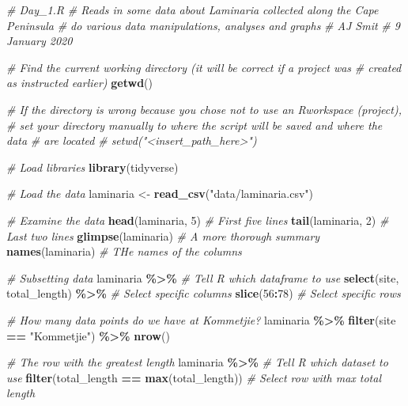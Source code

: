 \documentclass[
]{book}
\newenvironment{Shaded}{\begin{snugshade}}{\end{snugshade}}
\newcommand{\CommentTok}[1]{\textcolor[rgb]{0.56,0.35,0.01}{\textit{#1}}}
\newcommand{\DecValTok}[1]{\textcolor[rgb]{0.00,0.00,0.81}{#1}}
\newcommand{\KeywordTok}[1]{\textcolor[rgb]{0.13,0.29,0.53}{\textbf{#1}}}
\newcommand{\NormalTok}[1]{#1}
\newcommand{\OperatorTok}[1]{\textcolor[rgb]{0.81,0.36,0.00}{\textbf{#1}}}
\newcommand{\StringTok}[1]{\textcolor[rgb]{0.31,0.60,0.02}{#1}}
\begin{document}
\begin{Shaded}
\begin{Highlighting}[]
\CommentTok{\# Day\_1.R}
\CommentTok{\# Reads in some data about Laminaria collected along the Cape Peninsula}
\CommentTok{\# do various data manipulations, analyses and graphs}
\CommentTok{\# AJ Smit}
\CommentTok{\# 9 January 2020}

\CommentTok{\# Find the current working directory (it will be correct if a project was}
\CommentTok{\# created as instructed earlier)}
\KeywordTok{getwd}\NormalTok{()}

\CommentTok{\# If the directory is wrong because you chose not to use an Rworkspace (project),}
\CommentTok{\# set your directory manually to where the script will be saved and where the data}
\CommentTok{\# are located}
\CommentTok{\# setwd("<insert\_path\_here>")}

\CommentTok{\# Load libraries}
\KeywordTok{library}\NormalTok{(tidyverse)}

\CommentTok{\# Load the data}
\NormalTok{laminaria <{-}}\StringTok{ }\KeywordTok{read\_csv}\NormalTok{(}\StringTok{"data/laminaria.csv"}\NormalTok{)}

\CommentTok{\# Examine the data}
\KeywordTok{head}\NormalTok{(laminaria, }\DecValTok{5}\NormalTok{) }\CommentTok{\# First five lines}
\KeywordTok{tail}\NormalTok{(laminaria, }\DecValTok{2}\NormalTok{) }\CommentTok{\# Last two lines}
\KeywordTok{glimpse}\NormalTok{(laminaria) }\CommentTok{\# A more thorough summary}
\KeywordTok{names}\NormalTok{(laminaria) }\CommentTok{\# THe names of the columns}

\CommentTok{\# Subsetting data}
\NormalTok{laminaria }\OperatorTok{\%>\%}\StringTok{ }\CommentTok{\# Tell R which dataframe to use}
\StringTok{  }\KeywordTok{select}\NormalTok{(site, total\_length) }\OperatorTok{\%>\%}\StringTok{ }\CommentTok{\# Select specific columns}
\StringTok{  }\KeywordTok{slice}\NormalTok{(}\DecValTok{56}\OperatorTok{:}\DecValTok{78}\NormalTok{) }\CommentTok{\# Select specific rows}

\CommentTok{\# How many data points do we have at Kommetjie?}
\NormalTok{laminaria }\OperatorTok{\%>\%}
\StringTok{  }\KeywordTok{filter}\NormalTok{(site }\OperatorTok{==}\StringTok{ "Kommetjie"}\NormalTok{) }\OperatorTok{\%>\%}
\StringTok{  }\KeywordTok{nrow}\NormalTok{()}

\CommentTok{\# The row with the greatest length}
\NormalTok{laminaria }\OperatorTok{\%>\%}\StringTok{ }\CommentTok{\# Tell R which dataset to use}
\StringTok{  }\KeywordTok{filter}\NormalTok{(total\_length }\OperatorTok{==}\StringTok{ }\KeywordTok{max}\NormalTok{(total\_length)) }\CommentTok{\# Select row with max total length}
\end{Highlighting}
\end{Shaded}
\end{document}
